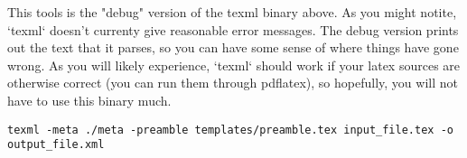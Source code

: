 \begin{gram} 
This tools is the "debug" version of the texml binary above. As you might notite, `texml` doesn't currenty give reasonable error messages.  The debug version prints out the text that it parses, so you can have some sense of where things have gone wrong.  As you will likely experience, `texml` should work if your latex sources are otherwise correct (you can run them through pdflatex), so hopefully, you will not have to use this binary much.  

\begin{lstlisting}
texml -meta ./meta -preamble templates/preamble.tex input_file.tex -o output_file.xml
\end{lstlisting}
\end{gram}








 




